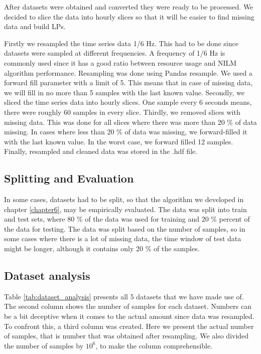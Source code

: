 After datasets were obtained and converted they were ready to be processed.
We decided to slice the data into hourly slices so that it will be easier to find missing data and build LPs.

Firstly we resampled the time series data  1/6 Hz. 
This had to be done since datasets were sampled at different frequencies.
A frequency of 1/6 Hz is commonly used since it has a good ratio between resource usage and NILM algorithm performance.
Resampling was done using Pandas resample. 
We used a forward fill parameter with a limit of 5.
This means that in case of missing data, we will fill in no more than 5 samples with the last known value.
Secondly, we sliced the time series data into hourly slices. 
One sample every 6 seconds means, there were roughly 60 samples in every slice.
Thirdly, we removed slices with missing data.
This was done for all slices where there was more than 20 \% of data missing.
In cases where less than 20 \% of data was missing, we forward-filled it with the last known value.
In the worst case, we forward filled 12 samples. 
Finally, resampled and cleaned data was stored in the .hdf file.


\subsection{Splitting and Evaluation} \label{ssec:ds_eval}

In some cases, datasets had to be split, so that the algorithm we developed in chapter \ref{chapter6}, may be empirically evaluated. 
The data was split into train and test sets, where 80 \% of the data was used for training and 20 \% percent of the data for testing.
The data was split based on the number of samples, so in some cases where there is a lot of missing data, the time window of test data might be longer, although it contains only 20 \% of the samples.

\subsection{Dataset analysis}
Table \ref{tab:dataset_analysis} presents all 5 datasets that we have made use of.
The second column shows the number of samples for each dataset.
Numbers can be a bit deceptive when it comes to the actual amount since data was resampled.
To confront this, a third column was created.
Here we present the actual number of samples,
that is number that was obtained after resampling.
We also divided the number of samples by $10^6$, to make the column comprehensible.

